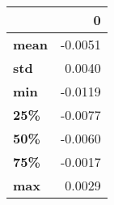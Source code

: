 \begin{tabular}{lr}
\toprule
{} &       0 \\
\midrule
\textbf{mean} & -0.0051 \\
\textbf{std } &  0.0040 \\
\textbf{min } & -0.0119 \\
\textbf{25\% } & -0.0077 \\
\textbf{50\% } & -0.0060 \\
\textbf{75\% } & -0.0017 \\
\textbf{max } &  0.0029 \\
\bottomrule
\end{tabular}
